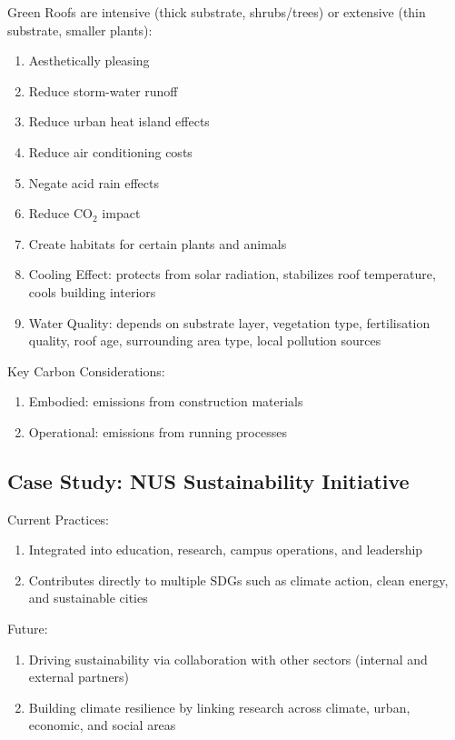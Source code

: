 \documentclass[12pt, a4paper]{article}
\begin{document}
\begin{multicols*}{3}
Green Roofs are intensive (thick substrate, shrubs/trees) or extensive (thin substrate, smaller plants):
\begin{enumerate}[\roman*.]
  \item Aesthetically pleasing
  \item Reduce storm-water runoff 
  \item Reduce urban heat island effects 
  \item Reduce air conditioning costs 
  \item Negate acid rain effects 
  \item Reduce $\text{CO}_2$ impact 
  \item Create habitats for certain plants and animals
  \item Cooling Effect: protects from solar radiation, stabilizes roof temperature, cools building interiors
  \item Water Quality: depends on substrate layer, vegetation type, fertilisation quality, roof age, surrounding area type, local pollution sources
\end{enumerate}

Key Carbon Considerations:  
\begin{enumerate}[\roman*.]
  \item Embodied: emissions from construction materials
  \item Operational: emissions from running processes
\end{enumerate}
\colbreak
\subsection{Case Study: NUS Sustainability Initiative}
Current Practices:
\begin{enumerate}[\roman*.]
  \item Integrated into education, research, campus operations, and leadership
  \item Contributes directly to multiple SDGs such as climate action, clean energy, and sustainable cities
\end{enumerate}

Future:
\begin{enumerate}[\roman*.]
  \item Driving sustainability via collaboration with other sectors (internal and external partners)
  \item Building climate resilience by linking research across climate, urban, economic, and social areas
\end{enumerate}


\end{multicols*}
\end{document}
